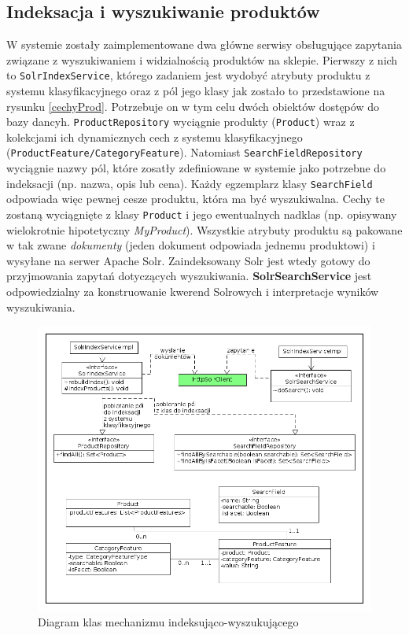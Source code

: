 \subsection{Indeksacja i wyszukiwanie produktów}
W systemie zostały zaimplementowane dwa główne serwisy obsługujące zapytania związane z wyszukiwaniem i widzialnością produktów na sklepie. Pierwszy z nich to \texttt{SolrIndexService}, którego zadaniem jest wydobyć atrybuty produktu z systemu klasyfikacyjnego oraz z pól jego klasy jak zostało to przedstawione na rysunku \ref{cechyProd}. Potrzebuje on w tym celu dwóch obiektów dostępów do bazy dancyh. \texttt{ProductRepository} wyciągnie produkty (\texttt{Product}) wraz z kolekcjami ich dynamicznych cech z systemu klasyfikacyjnego (\texttt{ProductFeature/CategoryFeature}). Natomiast \texttt{SearchFieldRepository} wyciągnie nazwy pól, które zosatły zdefiniowane w systemie jako potrzebne do indeksacji (np. nazwa, opis lub cena). Każdy egzemplarz klasy \texttt{SearchField} odpowiada więc pewnej cesze produktu, która ma być wyszukiwalna. Cechy te zostaną wyciągnięte z klasy \texttt{Product} i jego ewentualnych nadklas (np. opisywany wielokrotnie hipotetyczny \textit{MyProduct}). Wszystkie atrybuty produktu są pakowane w tak zwane \textit{dokumenty} (jeden dokument odpowiada jednemu produktowi) i wysyłane na serwer Apache Solr. Zaindeksowany Solr jest wtedy gotowy do przyjmowania zapytań dotyczących wyszukiwania. \textbf{SolrSearchService} jest odpowiedzialny za konstruowanie kwerend Solrowych i interpretacje wyników wyszukiwania.
\begin{figure}
	\begin{center}
		\includegraphics[scale=0.4]{klasy_solr.png}
	\end{center}
	\caption{{\color{black}Diagram klas mechanizmu indeksująco-wyszukującego}} \label{klasy_solr}
\end{figure}

